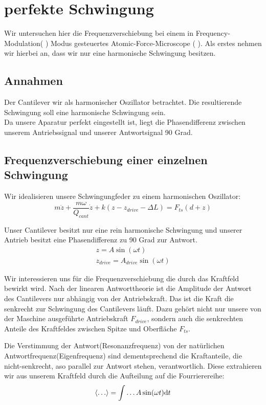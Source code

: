 \section{perfekte Schwingung}
Wir untersuchen hier die Frequenzverschiebung bei einem in Frequency-Modulation( \FM ) Modus gesteuertes Atomic-Force-Microscope ( \AFM ). Als erstes nehmen wir hierbei an, dass wir nur eine harmonische Schwingung besitzen.

\subsection{Annahmen}
Der Cantilever wir als harmonischer Oszillator betrachtet. Die resultierende Schwingung soll eine harmonische Schwingung sein.\\
Da unsere Aparatur perfekt eingestellt ist, liegt die Phasendifferenz zwischen unserem Antriebssignal und unserer Antwortsignal 90 Grad.

\subsection{Frequenzverschiebung einer einzelnen Schwingung}

Wir idealisieren unsere Schwingungfeder zu einem harmonischen Oszillator:
\begin{equation}
	m \ddot{z} + \frac{m \omega}{Q_{cant}} \dot{z} + k \left( z-z_{drive} - \Delta L \right) = F_{ts} (d+z) \label{federgleichung} 
\end{equation}

Unser Cantilever besitzt nur eine rein harmonische Schwingung und unserer Antrieb besitzt eine Phasendifferenz zu 90 Grad zur Antwort.
\begin{gather}
	z = A \sin ( \omega t) \\ 
	z_{drive} = A_{drive} \sin ( \omega t)
\end{gather}

Wir interessieren uns für die Frequenzverschiebung die durch das Kraftfeld bewirkt wird.
Nach der linearen Antworttheorie ist die Amplitude der Antwort des Cantilevers nur abhängig von der Antriebskraft. Das ist die Kraft die senkrecht zur Schwingung des Cantilevers läuft. Dazu gehört nicht nur unsere von der Maschine ausgeführte Antriebskraft $F_{drive}$, sondern auch die senkrechten Anteile des Kraftfeldes zwischen Spitze und Oberfläche $F_{ts}$.

Die Verstimmung der Antwort(Resonanzfrequenz) von der natürlichen Antwortfrequenz(Eigenfrequenz) sind dementsprechend die Kraftanteile, die nicht-senkrecht, aso parallel zur Antwort stehen, verantwortlich. 
Diese extrahieren wir aus unserem Kraftfeld durch die Aufteilung auf die Fourrierereihe:
\begin{equation}
	\mitlungz{ \dots } = \int \dots A \sin (\omega t) \mathrm{d} t
\end{equation}

